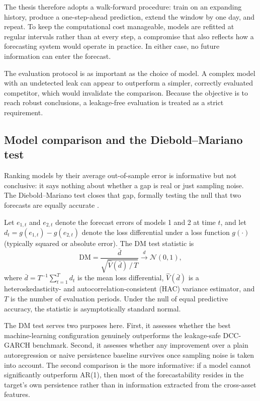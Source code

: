 The thesis therefore adopts a walk-forward procedure: train on an expanding history, produce a one-step-ahead prediction, extend the window by one day, and repeat. To keep the computational cost manageable, models are refitted at regular intervals rather than at every step, a compromise that also reflects how a forecasting system would operate in practice. In either case, no future information can enter the forecast.

The evaluation protocol is as important as the choice of model. A complex model with an undetected leak can appear to outperform a simpler, correctly evaluated competitor, which would invalidate the comparison. Because the objective is to reach robust conclusions, a leakage-free evaluation is treated as a strict requirement.

\subsection{Model comparison and the Diebold--Mariano test}

Ranking models by their average out-of-sample error is informative but not conclusive: it says nothing about whether a gap is real or just sampling noise. The Diebold--Mariano test closes that gap, formally testing the null that two forecasts are equally accurate \cite{diebold1995}.

Let $e_{1,t}$ and $e_{2,t}$ denote the forecast errors of models 1 and 2 at time $t$, and let $d_t = g(e_{1,t}) - g(e_{2,t})$ denote the loss differential under a loss function $g(\cdot)$ (typically squared or absolute error). The DM test statistic is
\begin{equation}
    \mathrm{DM} = \frac{\bar{d}}{\sqrt{\hat{V}(\bar{d})\,/\, T}} \xrightarrow{d} \mathcal{N}(0,1),
\end{equation}
where $\bar{d} = T^{-1}\sum_{t=1}^{T} d_t$ is the mean loss differential, $\hat{V}(\bar{d})$ is a heteroskedasticity- and autocorrelation-consistent (HAC) variance estimator, and $T$ is the number of evaluation periods. Under the null of equal predictive accuracy, the statistic is asymptotically standard normal.

The DM test serves two purposes here. First, it assesses whether the best machine-learning configuration genuinely outperforms the leakage-safe DCC-GARCH benchmark. Second, it assesses whether any improvement over a plain autoregression or naive persistence baseline survives once sampling noise is taken into account. The second comparison is the more informative: if a model cannot significantly outperform AR(1), then most of the forecastability resides in the target's own persistence rather than in information extracted from the cross-asset features.

